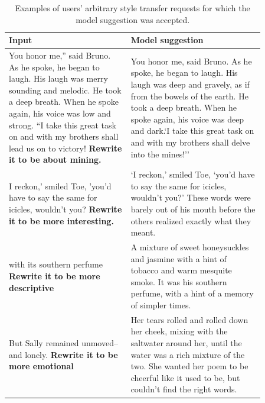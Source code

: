 \begin{table}[ht]
    \caption{Examples of users' arbitrary style transfer requests for which the model suggestion was accepted.}
    \label{tab:selected_usage_examples}
    \small
    \centering
    \def\arraystretch{1.5}%
    \begin{tabular}{p{0.41\linewidth} p{0.45\linewidth}}
    \toprule
      \textbf{Input} & \textbf{Model suggestion} \\ \hline
      You honor me,'' said Bruno. As he spoke, he began to laugh. His laugh was merry sounding and melodic. He took a deep breath. When he spoke again, his voice was low and strong. ``I take this great task on and with my brothers shall lead us on to victory! \newline \textbf{Rewrite it to be about mining.} & You honor me, said Bruno. As he spoke, he began to laugh. His laugh was deep and gravely, as if from the bowels of the earth. He took a deep breath. When he spoke again, his voice was deep and dark.`I take this great task on and with my brothers shall delve into the mines!'' \\ \hline
      I reckon,' smiled Toe, 'you'd have to say the same for icicles, wouldn't you? \newline \textbf{Rewrite it to be more interesting.} & ‘I reckon,’ smiled Toe, ‘you’d have to say the same for icicles, wouldn’t you?’ These words were barely out of his mouth before the others realized exactly what they meant.\\ \hline
      with its southern perfume \newline \textbf{Rewrite it to be more descriptive} & A mixture of sweet honeysuckles and jasmine  with  a  hint  of  tobacco  and warm mesquite smoke. It was his southern perfume, with a hint of a memory of simpler times.\\ \hline
      But Sally remained unmoved--and lonely. \newline \textbf{Rewrite it to be more emotional} & Her tears rolled and rolled down her cheek, mixing with the saltwater around her, until the water was a rich mixture of the two. She wanted her poem to be cheerful like it used to be, but couldn't find the right words. \\
    \bottomrule
    \end{tabular}
\end{table}

